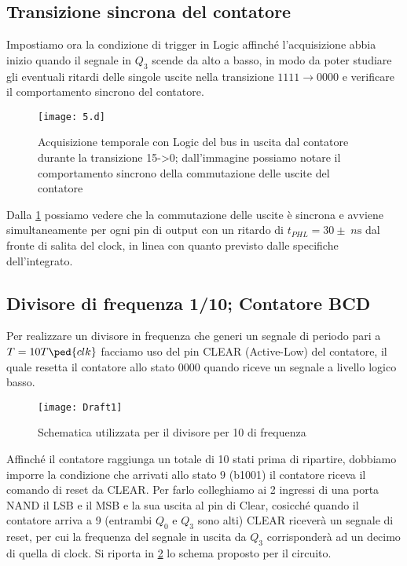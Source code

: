 \documentclass[10pt, a4paper, italian]{article}
\begin{document}
\subsection{Transizione sincrona del contatore}
\label{sec: count_trans}
Impostiamo ora la condizione di trigger in Logic affinché l'acquisizione abbia
inizio quando il segnale in $Q_3$ scende da alto a basso, in modo da poter
studiare gli eventuali ritardi delle singole uscite nella transizione
$1111 \to 0000$ e verificare il comportamento sincrono del contatore.
\begin{figure}[htbp]
\centering
	\texttt{[image: 5.d]}
	\caption{Acquisizione temporale con Logic del bus in uscita dal contatore durante la transizione 15->0; dall'immagine possiamo notare il comportamento sincrono della commutazione delle uscite del contatore \label{fig: Count_150}}
\end{figure}

Dalla \cref{fig: Count_150} possiamo vedere che la commutazione delle uscite è
sincrona e avviene simultaneamente per ogni pin di output con un ritardo di
$t_{PHL} = 30 \pm \; \si{n\s}$ dal fronte di salita del clock, in linea con
quanto previsto dalle specifiche dell'integrato.

\subsection{Divisore di frequenza 1/10; Contatore BCD}
Per realizzare un divisore in frequenza che generi un segnale di periodo pari
a $T = 10 T\ped{clk}$ facciamo uso del pin CLEAR (Active-Low) del contatore,
il quale resetta il contatore allo stato $0000$ quando riceve un segnale a
livello logico basso.
\begin{figure}[htbp]
\centering
	\texttt{[image: Draft1]}
	\caption{Schematica utilizzata per il divisore per 10 di frequenza
	\label{schem: 10_div}}
\end{figure}

Affinché il contatore raggiunga un totale di 10 stati prima di ripartire,
dobbiamo imporre la condizione che arrivati allo stato $9$ (b1001) il
contatore riceva il comando di reset da CLEAR.
Per farlo colleghiamo ai 2 ingressi di una porta NAND il LSB e il MSB e
la sua uscita al pin di Clear, cosicché quando il contatore arriva a 9
(entrambi $Q_0$ e $Q_3$ sono alti) CLEAR riceverà un segnale di reset,
per cui la frequenza del segnale in uscita da $Q_3$ corrisponderà ad un decimo
di quella di clock. Si riporta in \cref{schem: 10_div} lo schema proposto per
il circuito.
\end{document}
